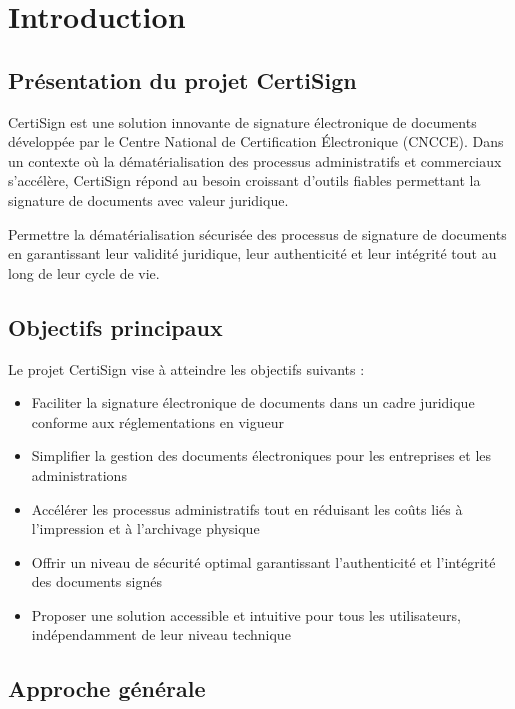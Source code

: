 \documentclass[a4paper,12pt]{report}
\begin{document}
\chapter{Introduction}

\section{Présentation du projet CertiSign}

CertiSign est une solution innovante de signature électronique de documents développée par le Centre National de Certification Électronique (CNCCE). Dans un contexte où la dématérialisation des processus administratifs et commerciaux s'accélère, CertiSign répond au besoin croissant d'outils fiables permettant la signature de documents avec valeur juridique.

\begin{tcolorbox}[title=Vision du projet, colback=lightgreen!30!white]
Permettre la dématérialisation sécurisée des processus de signature de documents en garantissant leur validité juridique, leur authenticité et leur intégrité tout au long de leur cycle de vie.
\end{tcolorbox}

\section{Objectifs principaux}

Le projet CertiSign vise à atteindre les objectifs suivants :

\begin{itemize}
    \item Faciliter la signature électronique de documents dans un cadre juridique conforme aux réglementations en vigueur
    \item Simplifier la gestion des documents électroniques pour les entreprises et les administrations
    \item Accélérer les processus administratifs tout en réduisant les coûts liés à l'impression et à l'archivage physique
    \item Offrir un niveau de sécurité optimal garantissant l'authenticité et l'intégrité des documents signés
    \item Proposer une solution accessible et intuitive pour tous les utilisateurs, indépendamment de leur niveau technique
\end{itemize}

\section{Approche générale}
\end{document}
